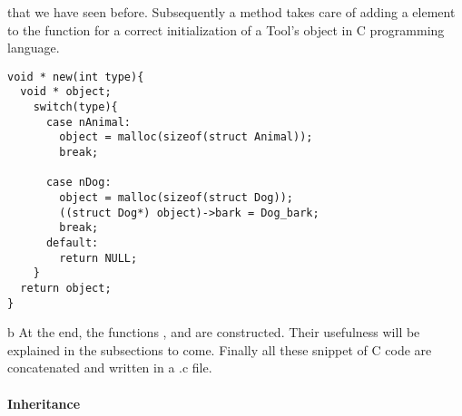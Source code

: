 that we have seen before. %
Subsequently a method \lstset{style=customc}{\lstinline[basicstyle=\small\ttfamily]|addStructConstructor|}
takes care of adding a \lstset{style=customc}{\lstinline[basicstyle=\small\ttfamily]|case|} element
to the \lstset{style=customc}{\lstinline[basicstyle=\small\ttfamily]|new|} function for a correct
initialization of a Tool's object in C programming language.
\begin{lstlisting}[caption={In the case of the example used in the section 2. Examples}, captionpos=b]
void * new(int type){
  void * object;
    switch(type){
      case nAnimal:
        object = malloc(sizeof(struct Animal));
        break;

      case nDog:
        object = malloc(sizeof(struct Dog));
        ((struct Dog*) object)->bark = Dog_bark;
        break;
      default:
        return NULL;
    }
  return object;
}
\end{lstlisting}
b
\newline
At the end, the functions
\newline
\lstset{style=customc}{\lstinline[basicstyle=\small\ttfamily]|void helper_reverse_plus(char str[], int len)|},
\lstset{style=customc}{\lstinline[basicstyle=\small\ttfamily]|char* itoa(int num)|} and
\lstset{style=customc}{\lstinline[basicstyle=\small\ttfamily]|int * arrayAlloc(int size)|} are constructed.
Their usefulness will be explained in the subsections to come.
\newline
Finally all these snippet of C code are concatenated and written in a .c file.
\newline
\paragraph{Inheritance}

